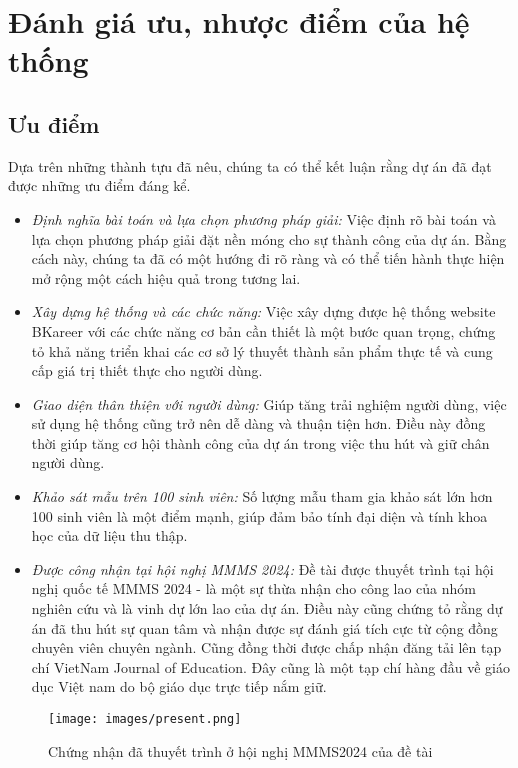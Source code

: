 \section{Đánh giá ưu, nhược điểm của hệ thống}
    \subsection{Ưu điểm}
        Dựa trên những thành tựu đã nêu, chúng ta có thể kết luận rằng dự án đã đạt được những ưu điểm đáng kể.
        
        \begin{itemize}
            \item \textit{Định nghĩa bài toán và lựa chọn phương pháp giải:} Việc định rõ bài toán và lựa chọn phương pháp giải đặt nền móng cho sự thành công của dự án. Bằng cách này, chúng ta đã có một hướng đi rõ ràng và có thể tiến hành thực hiện mở rộng một cách hiệu quả trong tương lai.
            \item \textit{Xây dựng hệ thống và các chức năng:} Việc xây dựng được hệ thống website BKareer với các chức năng cơ bản cần thiết là một bước quan trọng, chứng tỏ khả năng triển khai các cơ sở lý thuyết thành sản phẩm thực tế và cung cấp giá trị thiết thực cho người dùng.
            \item \textit{Giao diện thân thiện với người dùng:} Giúp tăng trải nghiệm người dùng, việc sử dụng hệ thống cũng trở nên dễ dàng và thuận tiện hơn. Điều này đồng thời giúp tăng cơ hội thành công của dự án trong việc thu hút và giữ chân người dùng.
            \item \textit{Khảo sát mẫu trên 100 sinh viên:} Số lượng mẫu tham gia khảo sát lớn hơn 100 sinh viên là một điểm mạnh, giúp đảm bảo tính đại diện và tính khoa học của dữ liệu thu thập.
            \item \textit{Được công nhận tại hội nghị MMMS 2024:} Đề tài được thuyết trình tại hội nghị quốc tế MMMS 2024 - là một sự thừa nhận cho công lao của nhóm nghiên cứu và là vinh dự lớn lao của dự án. Điều này cũng chứng tỏ rằng dự án đã thu hút sự quan tâm và nhận được sự đánh giá tích cực từ cộng đồng chuyên viên chuyên ngành. Cũng đồng thời được chấp nhận đăng tải lên tạp chí VietNam Journal of Education. Đây cũng là một tạp chí hàng đầu về giáo dục Việt nam do bộ giáo dục trực tiếp nắm giữ.
        \end{itemize}
        \begin{figure}[H]
            \centering
            \texttt{[image: images/present.png]}
            \vspace{0.6cm}
            \caption{Chứng nhận đã thuyết trình ở hội nghị MMMS2024 của đề tài}
        \end{figure}
    
